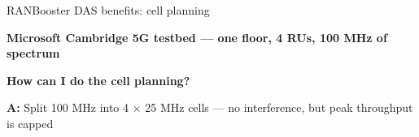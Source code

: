 \begin{frame}[t]{RANBooster DAS benefits: cell planning}
  \vspace{0.1em}
  {\small\textbf{Microsoft Cambridge 5G testbed --- one floor, 4 RUs, 100 MHz of
    spectrum}\par}

  \vspace{0.4em}
  {\small\textbf{How can I do the cell planning?}\par}
  \vspace{0.2em}
  {\small\color{talkred}\textbf{A:} Split 100 MHz into 4 $\times$ 25 MHz cells ---
    no interference, but peak throughput is capped\par}


\end{frame}
